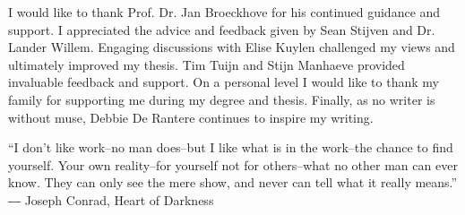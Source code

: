 I would like to thank Prof. Dr. Jan Broeckhove for his continued guidance and support. 
I appreciated the advice and feedback given by Sean Stijven and Dr. Lander Willem.
Engaging discussions with Elise Kuylen challenged my views and ultimately improved my thesis. Tim Tuijn and Stijn Manhaeve provided invaluable feedback and support.
On a personal level I would like to thank my family for supporting me during my degree and thesis. 
Finally, as no writer is without muse, Debbie De Rantere continues to inspire my writing. \\

%
\begin{displayquote}
“I don't like work--no man does--but I like what is in the work--the chance to find yourself. Your own reality--for yourself not for others--what no other man can ever know. They can only see the mere show, and never can tell what it really means.” \\
― Joseph Conrad, Heart of Darkness
\end{displayquote}

